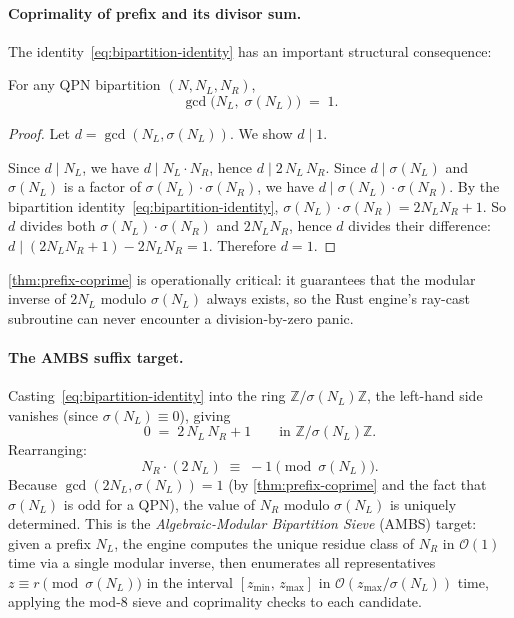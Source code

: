 \paragraph{Coprimality of prefix and its divisor sum.}
The identity~\eqref{eq:bipartition-identity} has an important structural
consequence:

\begin{theorem}\label{thm:prefix-coprime}
For any QPN bipartition $(N, N_L, N_R)$,
\[
  \gcd\bigl(N_L,\;\sigma(N_L)\bigr) \;=\; 1.
\]
\end{theorem}

\begin{proof}
Let $d = \gcd(N_L, \sigma(N_L))$.  We show $d \mid 1$.

Since $d \mid N_L$, we have $d \mid N_L \cdot N_R$, hence
$d \mid 2\,N_L\,N_R$.
Since $d \mid \sigma(N_L)$ and $\sigma(N_L)$ is a factor of
$\sigma(N_L)\cdot\sigma(N_R)$, we have $d \mid \sigma(N_L)\cdot\sigma(N_R)$.
By the bipartition identity~\eqref{eq:bipartition-identity},
$\sigma(N_L)\cdot\sigma(N_R) = 2N_LN_R + 1$.
So $d$ divides both $\sigma(N_L)\cdot\sigma(N_R)$ and
$2N_LN_R$, hence $d$ divides their difference:
$d \mid (2N_LN_R+1) - 2N_LN_R = 1$.
Therefore $d = 1$.
\end{proof}

\cref{thm:prefix-coprime} is operationally critical: it guarantees that the
modular inverse of $2 N_L$ modulo $\sigma(N_L)$ always exists, so the Rust
engine's ray-cast subroutine can never encounter a division-by-zero panic.

\paragraph{The AMBS suffix target.}
Casting~\eqref{eq:bipartition-identity} into the ring
$\mathbb{Z}/\sigma(N_L)\mathbb{Z}$, the left-hand side vanishes (since
$\sigma(N_L) \equiv 0$), giving
\[
  0 \;=\; 2\,N_L\,N_R + 1
  \qquad\text{in } \mathbb{Z}/\sigma(N_L)\mathbb{Z}.
\]
Rearranging:
\begin{equation}\label{eq:ambs-target}
  N_R \cdot (2\,N_L) \;\equiv\; -1 \pmod{\sigma(N_L)}.
\end{equation}
Because $\gcd(2 N_L, \sigma(N_L)) = 1$ (by \cref{thm:prefix-coprime} and
the fact that $\sigma(N_L)$ is odd for a QPN), the value of $N_R$ modulo
$\sigma(N_L)$ is uniquely determined.  This is the \emph{Algebraic-Modular
Bipartition Sieve} (AMBS) target: given a prefix $N_L$, the engine computes
the unique residue class of $N_R$ in $\mathcal{O}(1)$ time via a single
modular inverse, then enumerates all representatives
$z \equiv r \pmod{\sigma(N_L)}$ in the interval $[z_{\min},\, z_{\max}]$
in $\mathcal{O}(z_{\max}/\sigma(N_L))$ time, applying the mod-8 sieve
and coprimality checks to each candidate.

